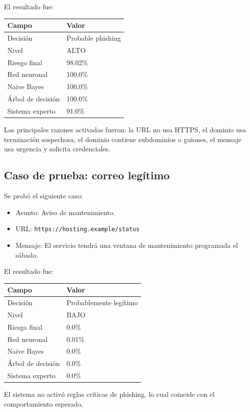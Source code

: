 \documentclass[12pt,letterpaper]{article}
\begin{document}
El resultado fue:

\begin{longtable}{p{7cm}p{5cm}}
\toprule
\textbf{Campo} & \textbf{Valor} \\
\midrule
Decisión & Probable phishing \\
Nivel & ALTO \\
Riesgo final & 98.02\% \\
Red neuronal & 100.0\% \\
Naive Bayes & 100.0\% \\
Árbol de decisión & 100.0\% \\
Sistema experto & 91.0\% \\
\bottomrule
\end{longtable}

Las principales razones activadas fueron: la URL no usa HTTPS, el dominio usa terminación sospechosa, el dominio contiene subdominios o guiones, el mensaje usa urgencia y solicita credenciales.

\subsection{Caso de prueba: correo legítimo}

Se probó el siguiente caso:

\begin{itemize}
    \item Asunto: Aviso de mantenimiento.
    \item URL: \texttt{https://hosting.example/status}
    \item Mensaje: El servicio tendrá una ventana de mantenimiento programada el sábado.
\end{itemize}

El resultado fue:

\begin{longtable}{p{7cm}p{5cm}}
\toprule
\textbf{Campo} & \textbf{Valor} \\
\midrule
Decisión & Probablemente legítimo \\
Nivel & BAJO \\
Riesgo final & 0.0\% \\
Red neuronal & 0.01\% \\
Naive Bayes & 0.0\% \\
Árbol de decisión & 0.0\% \\
Sistema experto & 0.0\% \\
\bottomrule
\end{longtable}

El sistema no activó reglas críticas de phishing, lo cual coincide con el comportamiento esperado.
\end{document}

